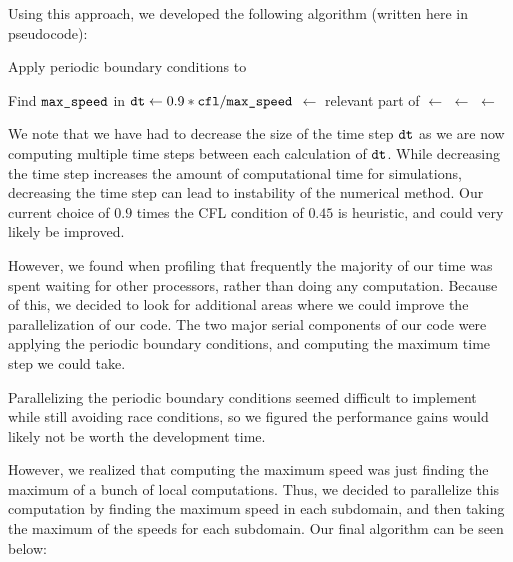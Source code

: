 Using this approach, we developed the following algorithm (written here in pseudocode):

\begin{algorithm}
\begin{algorithmic}[1]
\item Apply periodic boundary conditions to 
\item Find $\texttt{max\_speed}$ in 
\State $\texttt{dt} \gets 0.9*\texttt{cfl} / \texttt{max\_speed}$
	\State {} $\gets$ relevant part of 
		\State {} $\gets$  
		\State {} $\gets$ 
	\EndFor
	\State {} $\gets$ 
\EndFor
\end{algorithmic}
\end{algorithm}

We note that we have had to decrease the size of the time step $\texttt{dt}$ as we are now computing multiple time steps between each calculation of $\texttt{dt}$. While decreasing the time step increases the amount of computational time for simulations, decreasing the time step can lead to instability of the numerical method. Our current choice of $0.9$ times the CFL condition of $0.45$ is heuristic, and could very likely be improved.

However, we found when profiling that frequently the majority of our time was spent waiting for other processors, rather than doing any computation. Because of this, we decided to look for additional areas where we could improve the parallelization of our code. The two major serial components of our code were applying the periodic boundary conditions, and computing the maximum time step we could take. 

Parallelizing the periodic boundary conditions seemed difficult to implement while still avoiding race conditions, so we figured the performance gains would likely not be worth the development time. 

However, we realized that computing the maximum speed was just finding the maximum of a bunch of local computations. Thus, we decided to parallelize this computation by finding the maximum speed in each subdomain, and then taking the maximum of the speeds for each subdomain. Our final algorithm can be seen below:


